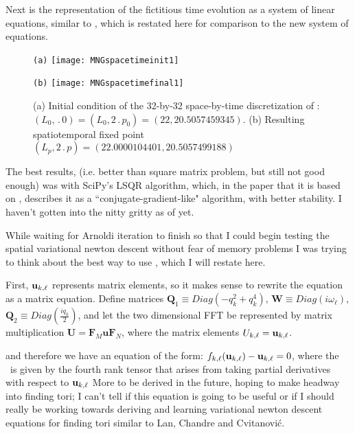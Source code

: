 Next is the representation of the fictitious time evolution as a system of linear equations, similar to
, which is restated here for comparison to the new system of equations.

\begin{figure}[ht]
\begin{minipage}[height=.32\textheight]{.45\textwidth}
\centering \small{\texttt{(a)}}
\texttt{[image: MNGspacetimeinit1]}
\end{minipage}
\begin{minipage}[height=.32\textheight]{.45\textwidth}
\centering \small{\texttt{(b)}}
\texttt{[image: MNGspacetimefinal1]}
\end{minipage}
\caption{ \label{fig:MNGspacetime11}
(a) Initial condition of the 32-by-32 space-by-time discretization of :
$(L_0,\period{0}) = (L_0, 2\period{p_0})= (22,20.5057459345)$.
(b) Resulting spatiotemporal fixed point
$(L_p,2\period{p}) =  (22.0000104401, 20.5057499188)$
}
\end{figure}


The best results, (i.e. better than square matrix problem, but still not
good enough) was with SciPy's LSQR algorithm, which, in the paper that
it is based on , describes it as a ``conjugate-gradient-like" algorithm,
with better stability. I haven't gotten into the nitty gritty as of yet.

While waiting for Arnoldi iteration to finish so that I could begin testing the
spatial variational {newton descent} without fear of memory problems I was trying to
think about the best way to use , which I will restate
here.

First, $\mathbf{u}_{k,\ell}$ represents matrix elements, so it makes sense
to rewrite the equation as a matrix equation. Define matrices
$\mathbf{Q}_1 \equiv Diag(-q_k^2 +q_k^4)$,
$\mathbf{W} \equiv Diag(i \omega_\ell)$,
$\mathbf{Q}_2 \equiv Diag(\frac{i q_k}{2})$, and let
the two dimensional FFT be represented by matrix multiplication
$\mathbf{U} = \mathbf{F}_M \mathbf{u} \mathbf{F}_N$,
where the matrix elements $U_{k,\ell} = \mathbf{u}_{k,\ell}$.

and therefore we have an equation of the form:
$f_{k,\ell}(\mathbf{u}_{k,\ell})-\mathbf{u}_{k,\ell} = 0$,
where the \jacobianM\ is given by the fourth rank tensor that arises from taking partial derivatives with
respect to $\mathbf{u}_{k,\ell}$
More to be derived in the future, hoping to make headway into finding tori; I can't tell if this equation
is going to be useful or if I should really be working towards deriving and learning variational {newton descent}
equations for finding tori similar to Lan, Chandre and Cvitanovi{\'c}.

